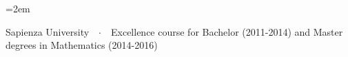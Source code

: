 \documentclass{scrartcl}
\newcommand{\Description}[1]{\hangindent=2em\hangafter=0\noindent\raggedright\footnotesize{#1}\par\normalsize\vspace{1em}} %
\begin{document}
\begin{cv}{}
\vspace{-0.5em} %

\Description{{\color{violet}Sapienza University}\ \ $\cdotp$\ \ Excellence course for Bachelor (2011-2014) and Master degrees in Mathematics (2014-2016)}




\vspace{1em}


\end{cv}
\end{document}
